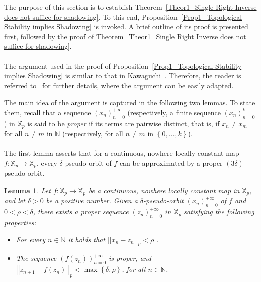 \documentclass[a4paper, 12pt]{article}
\newtheorem{lemma}[theorem]{Lemma}
\theoremstyle{definition}
\begin{document}
	
	The purpose of this section is to establish Theorem~\ref{Theor1_Single Right Inverse does not suffice for shadowing}. To this end, Proposition~\ref{Prop1_Topological Stability implies Shadowing} is invoked. A brief outline of its proof is presented first, followed by the proof of Theorem~\ref{Theor1_Single Right Inverse does not suffice for shadowing}.    
	
	
	\paragraph{} 
	
	The argument used in the proof of Proposition~\ref{Prop1_Topological Stability implies Shadowing} is similar to that in Kawaguchi~\cite{Kawaguchi_Topological_Stability_and_Shadowing_of_Zero-dimensional_Dynamical_Systems}. Therefore, the reader is referred to~\cite{Kawaguchi_Topological_Stability_and_Shadowing_of_Zero-dimensional_Dynamical_Systems} for further details, where the argument can be easily adapted.
	
	
	The main idea of the argument is captured in the following two lemmas. To state them, recall that a sequence $ \left(  x_{n}   \right)_{n=0}^{+ \infty }$ (respectively, a finite sequence $ \left(  x_{n}   \right)_{n=0}^{k}$) in $\mathbb{X}_{p}$ is said to be \emph{proper} if its terms are pairwise distinct, that is, if $x_{n}  \neq x_{m}$ for all $n \neq m$ in $\mathbb{N} $ (respectively, for all $n \neq m$ in $ \left\{  0, \dots, k  \right\} $). 
	
	
	
	
	\paragraph{}
	
	The first lemma asserts that for a continuous, nowhere locally constant map $f: \mathbb{X}_{p} \to \mathbb{X}_{p}$,  every $\delta$-pseudo-orbit of $f$ can be approximated by a proper $(3\delta)$-pseudo-orbit. 
	
	
	
	
	\begin{lemma}\label{Lem3_Local Images of Continuous s}
		Let $f: \mathbb{X}_{p} \to \mathbb{X}_{p}$ be a continuous, nowhere locally constant map in $\mathbb{X}_{p}$, and let $\delta  > 0$ be a positive number. Given a $\delta$-pseudo-orbit $ \left(  x_{n}   \right)_{n=0}^{+ \infty }$ of $f$ and $ 0  < \rho   < \delta $, there exists a proper sequence $ \left(  z_{n}   \right)_{n=0}^{+ \infty }$ in $\mathbb{X}_{p}$ satisfying the following properties: 
		\begin{itemize}
			\item For every $n \in \mathbb{N} $ it holds that $ \left| \left|  x_{n} - z_{n}  \right|  \right|_{p}  < \rho$ .
			\item The sequence $ \left(  f \left(  z_{n}  \right)    \right)_{n=0}^{+ \infty }$ is proper, and $ \left| \left|  z_{n+1} - f \left(  z_{n}  \right)   \right|  \right|_{p}  < \max \left\{  \delta, \rho  \right\}  $, for all $n \in \mathbb{N} $.
		\end{itemize} 
		
	\end{lemma}
	
\end{document}

